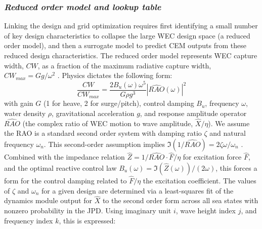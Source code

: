 \documentclass[10pt,twoside]{article}
\begin{document}
\subsubsection{\textit{Reduced order model and lookup table}}
Linking the design and grid optimization requires first identifying a small number of key design characteristics to collapse the large WEC design space (a reduced order model), and then a surrogate model to predict CEM outputs from these reduced design characteristics.
The reduced order model represents WEC capture width, $CW$, as a fraction of the maximum radiative capture width, $CW_{max}=Gg/\omega^2$ \cite{zou_practical_2023}. Physics dictates the following form:
\begin{equation}
    \label{eq:CW-fraction}
    \frac{CW}{CW_{max}} = \frac{2 B_u(\omega) \omega^5}{G \rho g^3} |\widehat{RAO}(\omega)|^2
\end{equation}
with gain $G$ (1 for heave, 2 for surge/pitch), control damping $B_u$, frequency $\omega$, water density $\rho$, gravitational acceleration $g$, and response amplitude operator $\widehat{RAO}$ (the complex ratio of WEC motion to wave amplitude, $\hat{X}/\eta$).
We assume the RAO is a standard second order system with damping ratio $\zeta$ and natural frequency $\omega_n$.
This second-order assumption implies $\Im(1/\widehat{RAO})=2\zeta\omega/\omega_n$ \cite{franklin2014feedback}.
Combined with the impedance relation $\hat{Z}=1/\widehat{RAO} \cdot \hat{F}/\eta$ for excitation force $\hat{F}$, and the optimal reactive control law $B_u(\omega) = \Im(\hat{Z}(\omega))/(2\omega)$, this forces a form for the control damping related to $\hat{F}/\eta$ the excitation coefficient.
The values of $\zeta$ and $\omega_n$ for a given design are determined via a least-squares fit of the dynamics module output for $\hat{X}$ to the second order form across all sea states with nonzero probability in the JPD.
Using imaginary unit $i$, wave height index $j$, and frequency index $k$, this is expressed:
\end{document}
